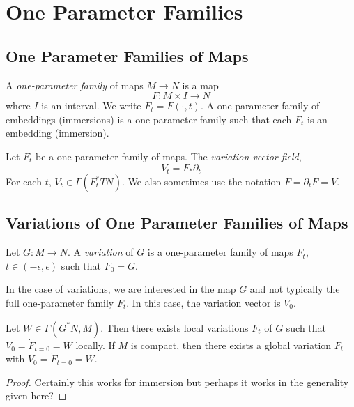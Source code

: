 \section{One Parameter Families}

\subsection*{One Parameter Families of Maps}

\begin{defn}
A \emph{one-parameter family} of maps \(M \to N\) is a map
\[
F : M \times I \to N
\]
where \(I\) is an interval. We write \(F_t = F(\cdot, t)\). A one-parameter family of embeddings (immersions) is a one parameter family such that each \(F_t\) is an embedding (immersion).
\end{defn}

\begin{defn}
Let \(F_t\) be a one-parameter family of maps. The \emph{variation vector field},
\[
V_t = F_{\ast} \partial_t
\]
For each \(t\), \(V_t \in \Gamma(F_t^{\ast} TN)\). We also sometimes use the notation \(\dot{F} = \partial_t F = V\).
\end{defn}

\subsection*{Variations of One Parameter Families of Maps}

\begin{defn}
Let \(G : M \to N\). A \emph{variation} of \(G\) is a one-parameter family of maps \(F_t\), \(t \in (-\epsilon, \epsilon)\) such that \(F_0 = G\).
\end{defn}

In the case of variations, we are interested in the map \(G\) and not typically the full one-parameter family \(F_t\). In this case, the variation vector is \(V_0\).

\begin{lemma}
Let \(W \in \Gamma(G^{\ast} N, M)\). Then there exists local variations \(F_t\) of \(G\) such that \(V_0 = \dot{F}_{t=0} = W\) locally. If \(M\) is compact, then there exists a global variation \(F_t\) with \(V_0 = \dot{F}_{t=0} = W\).
\end{lemma}

\begin{proof}
Certainly this works for immersion but perhaps it works in the generality given here?
\end{proof}

